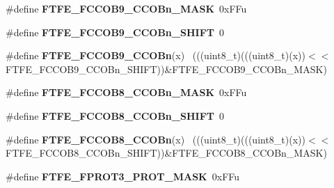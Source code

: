 \begin{DoxyCompactItemize}
\item 
\hypertarget{group___f_t_f_e___register___masks_ga6dd6be8d6e5ab42f88bc3864ff18988e}{}\#define {\bfseries F\+T\+F\+E\+\_\+\+F\+C\+C\+O\+B9\+\_\+\+C\+C\+O\+Bn\+\_\+\+M\+A\+S\+K}~0x\+F\+Fu\label{group___f_t_f_e___register___masks_ga6dd6be8d6e5ab42f88bc3864ff18988e}

\item 
\hypertarget{group___f_t_f_e___register___masks_gae878f577523db2f4b3e57defa8d0aa9f}{}\#define {\bfseries F\+T\+F\+E\+\_\+\+F\+C\+C\+O\+B9\+\_\+\+C\+C\+O\+Bn\+\_\+\+S\+H\+I\+F\+T}~0\label{group___f_t_f_e___register___masks_gae878f577523db2f4b3e57defa8d0aa9f}

\item 
\hypertarget{group___f_t_f_e___register___masks_ga225916758bde1b3f0f12365b8dd291f6}{}\#define {\bfseries F\+T\+F\+E\+\_\+\+F\+C\+C\+O\+B9\+\_\+\+C\+C\+O\+Bn}(x)                                      ~(((uint8\+\_\+t)(((uint8\+\_\+t)(x))$<$$<$F\+T\+F\+E\+\_\+\+F\+C\+C\+O\+B9\+\_\+\+C\+C\+O\+Bn\+\_\+\+S\+H\+I\+F\+T))\&F\+T\+F\+E\+\_\+\+F\+C\+C\+O\+B9\+\_\+\+C\+C\+O\+Bn\+\_\+\+M\+A\+S\+K)\label{group___f_t_f_e___register___masks_ga225916758bde1b3f0f12365b8dd291f6}

\item 
\hypertarget{group___f_t_f_e___register___masks_gab782fa18693d9a3113b2d58a492717b4}{}\#define {\bfseries F\+T\+F\+E\+\_\+\+F\+C\+C\+O\+B8\+\_\+\+C\+C\+O\+Bn\+\_\+\+M\+A\+S\+K}~0x\+F\+Fu\label{group___f_t_f_e___register___masks_gab782fa18693d9a3113b2d58a492717b4}

\item 
\hypertarget{group___f_t_f_e___register___masks_ga4d31b50304dbb610e569fd53dcb8eed5}{}\#define {\bfseries F\+T\+F\+E\+\_\+\+F\+C\+C\+O\+B8\+\_\+\+C\+C\+O\+Bn\+\_\+\+S\+H\+I\+F\+T}~0\label{group___f_t_f_e___register___masks_ga4d31b50304dbb610e569fd53dcb8eed5}

\item 
\hypertarget{group___f_t_f_e___register___masks_gac10984f84fe41b279731ee7423cdcf64}{}\#define {\bfseries F\+T\+F\+E\+\_\+\+F\+C\+C\+O\+B8\+\_\+\+C\+C\+O\+Bn}(x)                                      ~(((uint8\+\_\+t)(((uint8\+\_\+t)(x))$<$$<$F\+T\+F\+E\+\_\+\+F\+C\+C\+O\+B8\+\_\+\+C\+C\+O\+Bn\+\_\+\+S\+H\+I\+F\+T))\&F\+T\+F\+E\+\_\+\+F\+C\+C\+O\+B8\+\_\+\+C\+C\+O\+Bn\+\_\+\+M\+A\+S\+K)\label{group___f_t_f_e___register___masks_gac10984f84fe41b279731ee7423cdcf64}

\item 
\hypertarget{group___f_t_f_e___register___masks_gaa08f3df6f890d183bd5864a6d08dc3b9}{}\#define {\bfseries F\+T\+F\+E\+\_\+\+F\+P\+R\+O\+T3\+\_\+\+P\+R\+O\+T\+\_\+\+M\+A\+S\+K}~0x\+F\+Fu\label{group___f_t_f_e___register___masks_gaa08f3df6f890d183bd5864a6d08dc3b9}


\end{DoxyCompactItemize}
